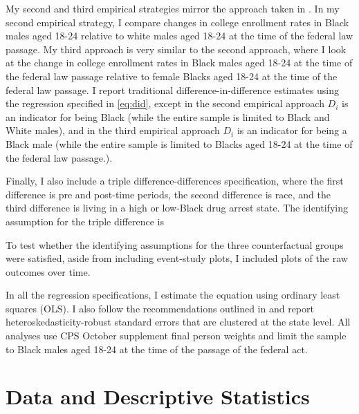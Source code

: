 \documentclass{article}
\begin{document}
My second and third empirical strategies mirror the approach taken in \cite {britton2022}. In my second empirical strategy, I compare changes in college enrollment rates in Black males aged 18-24 relative to white males aged 18-24 at the time of the federal law passage. My third approach is very similar to the second approach, where I look at the change in college enrollment rates in Black males aged 18-24 at the time of the federal law passage relative to female Blacks aged 18-24 at the time of the federal law passage. I report traditional difference-in-difference estimates using the regression specified in \ref{eq:did}, except in the second empirical approach $D_i$ is an indicator for being Black (while the entire sample is limited to Black and White males), and in the third empirical approach $D_i$ is an indicator for being a Black male (while the entire sample is limited to Blacks aged 18-24 at the time of the federal law passage.).

Finally, I also include a triple difference-differences specification, where the first difference is pre and post-time periods, the second difference is race, and the third difference is living in a high or low-Black drug arrest state. The identifying assumption for the triple difference is 

To test whether the identifying assumptions for the three counterfactual groups were satisfied, aside from including event-study plots, I included plots of the raw outcomes over time.

In all the regression specifications, I estimate the equation using ordinary least squares (OLS). I also follow the recommendations outlined in \cite{duflo_did} and report heteroskedasticity-robust standard errors that are clustered at the state level. All analyses use CPS October supplement final person weights and limit the sample to Black males aged 18-24 at the time of the passage of the federal act.

\section{Data and Descriptive Statistics}
\end{document}
